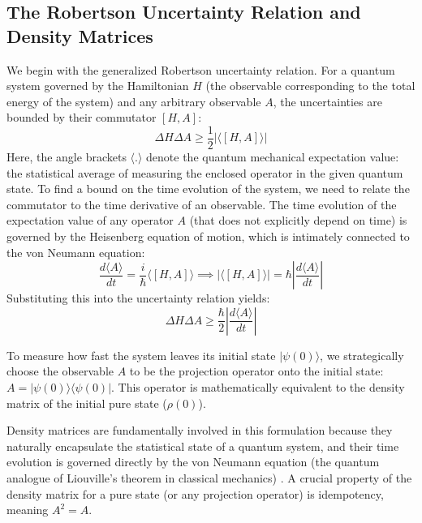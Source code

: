 \subsection{The Robertson Uncertainty Relation and Density Matrices}
We begin with the generalized Robertson uncertainty relation. For a quantum system governed by the Hamiltonian $H$ (the observable corresponding to the total energy of the system) and any arbitrary observable $A$, the uncertainties are bounded by their commutator $[H, A]$:
\begin{equation}
    \Delta H \Delta A \ge \frac{1}{2} |\langle [H, A] \rangle|
\end{equation}
Here, the angle brackets $\langle . \rangle$ denote the quantum mechanical expectation value: the statistical average of measuring the enclosed operator in the given quantum state.
To find a bound on the time evolution of the system, we need to relate the commutator to the time derivative of an observable. The time evolution of the expectation value of any operator $A$ (that does not explicitly depend on time) is governed by the Heisenberg equation of motion, which is intimately connected to the von Neumann equation:
\begin{equation}
    \frac{d\langle A \rangle}{dt} = \frac{i}{\hbar} \langle [H, A] \rangle \implies |\langle [H, A] \rangle| = \hbar \left| \frac{d\langle A \rangle}{dt} \right|
\end{equation}
Substituting this into the uncertainty relation yields:
\begin{equation}
    \Delta H \Delta A \ge \frac{\hbar}{2} \left| \frac{d\langle A \rangle}{dt} \right|
\end{equation}

To measure how fast the system leaves its initial state $|\psi(0)\rangle$, we strategically choose the observable $A$ to be the projection operator onto the initial state: $A = |\psi(0)\rangle \langle \psi(0)|$. This operator is mathematically equivalent to the density matrix of the initial pure state ($\rho(0)$). 

Density matrices are fundamentally involved in this formulation because they naturally encapsulate the statistical state of a quantum system, and their time evolution is governed directly by the von Neumann equation (the quantum analogue of Liouville's theorem in classical mechanics) \cite{bertlmann2008}. A crucial property of the density matrix for a pure state (or any projection operator) is idempotency, meaning $A^2 = A$. 

